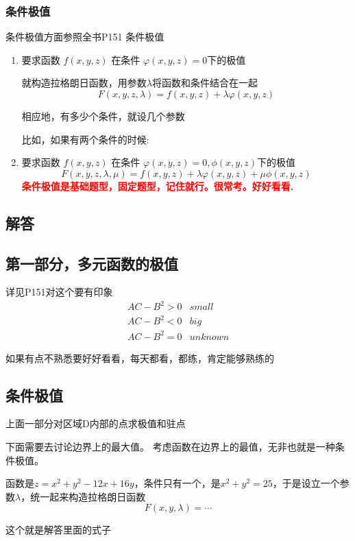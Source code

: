 \documentclass[a4paper]{ctexart}
\begin{document}
\begin{multicols}{2}
\subsubsection{条件极值}
\par 条件极值方面参照全书P151 \quad 条件极值
\begin{enumerate}
\item 要求函数 $f(x,y,z)$ 在条件 $\varphi(x,y,z)=0$下的极值
\par 就构造拉格朗日函数，用参数$\lambda$将函数和条件结合在一起
$$
F(x,y,z,\lambda) = f(x,y,z) + \lambda \varphi(x,y,z)
$$
\par 相应地，有多少个条件，就设几个参数
\par 比如，如果有两个条件的时候:
\item 要求函数 $f(x,y,z)$ 在条件 $\varphi(x,y,z)=0, \phi(x,y,z)$下的极值
$$
F(x,y,z,\lambda,\mu) = f(x,y,z) + \lambda \varphi(x,y,z) + \mu \phi(x,y,z)
$$
\textbf{\textcolor{red}{条件极值是基础题型，固定题型，记住就行。很常考。好好看看.}}
\end{enumerate}


\subsection{解答}
\subsection{第一部分，多元函数的极值}
\par 详见P151\quad 对这个要有印象
$$
\begin{array}{ll}
AC - B^2 > 0  & small\\
AC - B^2 < 0  & big\\
AC - B^2 = 0  & unknown
\end{array}
$$
\par 如果有点不熟悉要好好看看，每天都看，都练，肯定能够熟练的

\subsection{条件极值}
\par 上面一部分对区域D内部的点求极值和驻点
\par 下面需要去讨论边界上的最大值。 考虑函数在边界上的最值，无非也就是一种条件极值。
\par 函数是$z = x^2 + y^2 -12 x + 16y$，条件只有一个，是$x^2 + y^2 = 25$，于是设立一个参数$\lambda$，统一起来构造拉格朗日函数
$$
F(x,y,\lambda) = \cdots
$$
\par 这个就是解答里面的式子


\end{multicols}
\end{document}
